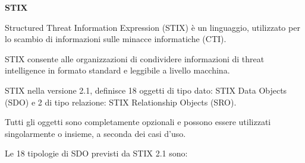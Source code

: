 \newpage

\textbf{STIX}\newline

Structured Threat Information Expression (STIX) è un linguaggio, utilizzato per lo scambio di informazioni sulle minacce informatiche (CTI).\par
STIX consente alle organizzazioni di condividere informazioni di threat intelligence in formato standard e leggibile a livello macchina.\par
STIX nella versione 2.1, definisce 18 oggetti di tipo dato: STIX Data Objects (SDO) e 2 di tipo relazione: STIX Relationship Objects (SRO). \par
Tutti gli oggetti sono completamente opzionali e possono essere utilizzati singolarmente o insieme, a seconda dei casi d’uso.\newline

Le 18 tipologie di SDO previsti da STIX 2.1 sono:


